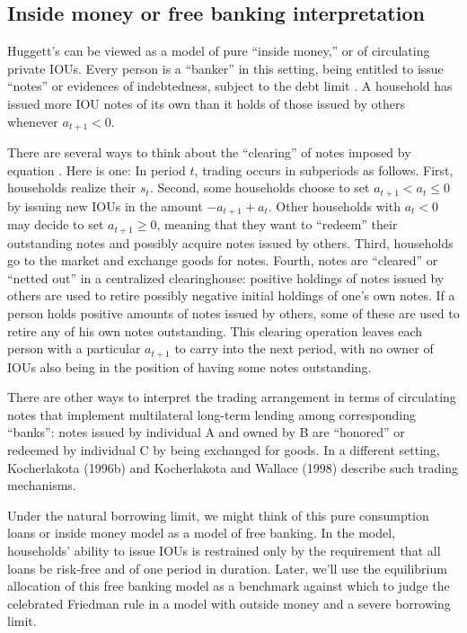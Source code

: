 \subsection{Inside money or free banking interpretation}

  Huggett's can be viewed as  a model of  pure ``inside money,'' or
of circulating private IOUs.  Every person is a ``banker'' in
this setting, being entitled to issue ``notes'' or evidences of indebtedness, subject
to the debt limit .    A household has
issued  more IOU notes of its own  than it holds of those issued by others     whenever $a_{t+1} < 0$.



  There are several ways to think about
the ``clearing'' of notes imposed by equation .
Here is one:  In period $t$, trading occurs in subperiods as
follows. First, households realize their $s_t$.  Second, some
households  choose to set $a_{t+1} < a_t \leq 0$ by  issuing new
IOUs in the amount $-a_{t+1} +a_t$.
    Other households with $a_t < 0$ may decide
to set $a_{t+1} \geq  0$, meaning that they want to ``redeem''  their
outstanding notes and possibly acquire notes issued by others.
Third, households go to the market and
exchange goods  for notes.  Fourth, notes are ``cleared''
or ``netted out'' in a centralized clearinghouse:
  positive holdings of  notes
issued by  others are used to retire possibly negative initial holdings of
one's own notes.   If a person holds positive
amounts of notes issued by others, some of these are used to retire
any of his own notes outstanding. This clearing operation leaves each person
with a particular
 $a_{t+1}$ to carry into the next period, with no owner of IOUs
also
being in the position of having some notes outstanding.

  There are other ways to interpret the trading arrangement in terms
of circulating notes that implement multilateral long-term lending
among corresponding ``banks'': notes issued by individual A and
owned by B are ``honored'' or redeemed  by individual C by being
exchanged for goods.  In a different
setting, Kocherlakota (1996b) and Kocherlakota and Wallace (1998)
describe such trading mechanisms.


Under the natural borrowing limit, we might think of this pure consumption
loans or inside money model as a model of free banking.  In
the model,  households' ability to issue IOUs is restrained only by the
requirement that all loans be  risk-free and of one period in duration.
Later, we'll use the equilibrium allocation of this free banking
model as a benchmark against which to judge the celebrated
Friedman rule in a model with outside money and a severe borrowing
limit.

